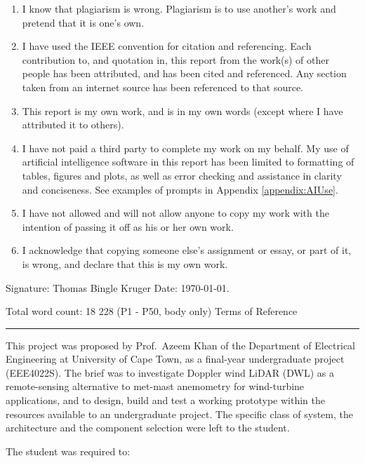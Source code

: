 \documentclass[a4paper,11pt]{report}
\begin{document}
\vskip 10mm
\begin{enumerate}
	\item I know that plagiarism is wrong. Plagiarism is to use another's work and pretend that it is one's own.
	\item I have used the IEEE convention for citation and referencing. Each contribution to, and quotation in, this report from the work(s) of other people has been attributed, and has been cited and referenced. Any section taken from an internet source has been referenced to that source.
	\item This report is my own work, and is in my own words (except where I have attributed it to others).
	\item I have not paid a third party to complete my work on my behalf. My use of artificial intelligence software in this report has been limited to formatting of tables, figures and plots, as well as error checking and assistance in clarity and conciseness. See examples of prompts in Appendix \ref{appendix:AIUse}. 
	\item I have not allowed and will not allow anyone to copy my work with the intention of passing it off as his or her own work.
	\item I acknowledge that copying someone else's assignment or essay, or part of it, is wrong, and declare that this is my own work.
\end{enumerate}

\vskip 10mm
Signature: Thomas Bingle Kruger 		%
\vskip10mm
Date: \today.

Total word count: 18 228 (P1 - P50, body only)
\newpage
\thispagestyle{empty}
{\Large Terms of Reference}\\
\hrule

This project was proposed by Prof.\ Azeem Khan of the Department of Electrical Engineering at University of Cape Town, as a final-year undergraduate
project (EEE4022S). The brief was to investigate Doppler wind LiDAR (DWL) as a
remote-sensing alternative to met-mast anemometry for wind-turbine applications,
and to design, build and test a working prototype within the resources available
to an undergraduate project. The specific class of system, the architecture and
the component selection were left to the student.

The student was required to:
\end{document}
